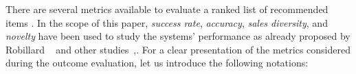 





There are several metrics available to evaluate a ranked list of recommended items \cite{DBLP:conf/rweb/NoiaO15}. In the scope of this paper, \emph{success rate}, \emph{accuracy}, \emph{sales diversity}, and \emph{novelty} have been used to study the systems' performance as already proposed by Robillard \etal~\cite{Robillard:2014:RSS:2631387} and other studies~\cite{6671293},\cite{Nguyen:2015:ESP:2740908.2742141}. For a clear presentation of the metrics considered during the outcome evaluation, let us introduce the following notations:

